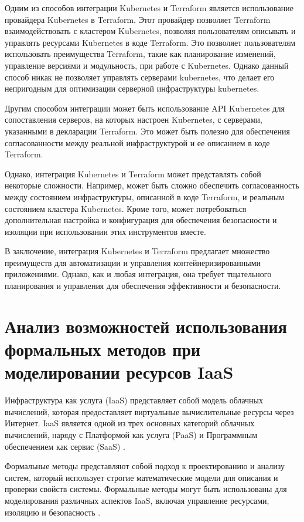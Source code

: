 Одним из способов интеграции Kubernetes и Terraform является использование
провайдера Kubernetes в Terraform. Этот провайдер позволяет Terraform
взаимодействовать с кластером Kubernetes, позволяя пользователям описывать
и управлять ресурсами Kubernetes в коде Terraform. Это позволяет
пользователям использовать преимущества Terraform, такие как планирование
изменений, управление версиями и модульность, при работе с Kubernetes.
Однако данный способ никак не позволяет управлять серверами
kubernetes, что делает его непригодным для оптимизации серверной
инфраструктуры kubernetes.\cite{davis2021bootstrapping}

Другим способом интеграции может быть использование API Kubernetes
для сопоставления серверов, на которых настроен Kubernetes, с серверами,
указанными в декларации Terraform. Это может быть полезно для обеспечения
согласованности между реальной инфраструктурой и ее описанием в коде
Terraform.

Однако, интеграция Kubernetes и Terraform может представлять собой
некоторые сложности. Например, может быть сложно обеспечить согласованность
между состоянием инфраструктуры, описанной в коде Terraform,
и реальным состоянием кластера Kubernetes. Кроме того, может
потребоваться дополнительная настройка и конфигурация для обеспечения
безопасности и изоляции при использовании этих инструментов вместе.

В заключение, интеграция Kubernetes и Terraform предлагает множество
преимуществ для автоматизации и управления контейнеризированными
приложениями. Однако, как и любая интеграция, она требует тщательного
планирования и управления для обеспечения эффективности и безопасности.

\section{Анализ возможностей использования формальных методов при
моделировании ресурсов IaaS}
Инфраструктура как услуга (IaaS) представляет собой модель облачных
вычислений, которая предоставляет виртуальные вычислительные ресурсы
через Интернет. IaaS является одной из трех основных категорий облачных
вычислений, наряду с Платформой как услуга (PaaS) и Программным обеспечением
как сервис (SaaS) \cite{iaas2017}.

Формальные методы представляют собой подход к проектированию и анализу
систем, который использует строгие математические модели для описания
и проверки свойств системы. Формальные методы могут быть использованы
для моделирования различных аспектов IaaS, включая управление ресурсами,
изоляцию и безопасность 
\cite{bijon2014formal, amato2018improving, de2012formal}.

